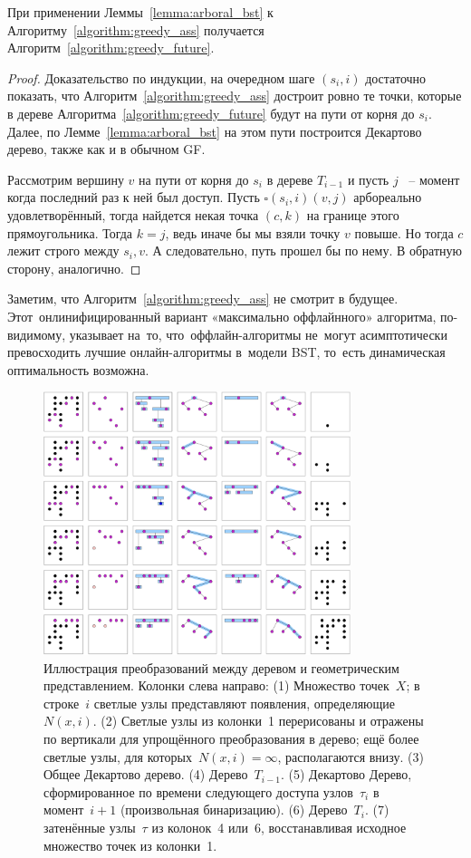 \documentclass[a4paper,11pt]{article}
\begin{document}
\begin{theorem}
	При применении Леммы~\ref{lemma:arboral_bst} к Алгоритму~\ref{algorithm:greedy_ass} получается Алгоритм~\ref{algorithm:greedy_future}.
\end{theorem}
\begin{proof}
	Доказательство по индукции, на очередном шаге $(s_i, i)$ достаточно показать, что Алгоритм~\ref{algorithm:greedy_ass} достроит ровно те точки, которые в дереве Алгоритма~\ref{algorithm:greedy_future} будут на пути от корня до $s_i$. 
	Далее, по Лемме~\ref{lemma:arboral_bst} на этом пути построится Декартово дерево, также как и в обычном GF.

	Рассмотрим вершину $v$ на пути от корня до $s_i$ в дереве $T_{i - 1}$ и пусть $j$ ~-- момент когда последний раз к ней был доступ.
	Пусть $\square (s_i, i) (v, j)$ арбореально удовлетворённый, тогда найдется некая точка $(c, k)$ на границе этого прямоугольника.
	Тогда $k = j$, ведь иначе бы мы взяли точку $v$ повыше.
	Но тогда $c$ лежит строго между $s_i, v$. 
	А следовательно, путь прошел бы по нему.
	В обратную сторону, аналогично.
\end{proof}

Заметим, что Алгоритм~\ref{algorithm:greedy_ass} не смотрит в будущее.
Этот~онлинифицированный вариант «максимально оффлайнного» алгоритма, по-видимому, указывает на~то, что~оффлайн-алгоритмы не~могут асимптотически превосходить лучшие онлайн-алгоритмы в~модели BST, то~есть динамическая оптимальность возможна.

\newpage
\begin{figure}[htpb]
	\centering
	\includegraphics[width=0.8\textwidth]{img/geometry.png}
	\caption{Иллюстрация преобразований между деревом и геометрическим представлением. Колонки слева направо:
(1) Множество точек~$X$; в строке~$i$ светлые узлы представляют появления, определяющие~$N(x, i)$. 
(2) Светлые узлы из колонки~1 перерисованы и отражены по вертикали для упрощённого преобразования в дерево; ещё более светлые узлы, для которых~$N(x, i) = \infty$, располагаются внизу.
(3) Общее Декартово дерево. 
(4) Дерево~$T_{i-1}$. 
(5) Декартово Дерево, сформированное по времени следующего доступа узлов~$\tau_i$ в момент~$i+1$ (произвольная бинаризацию).
(6) Дерево~$T_i$.
(7) затенённые узлы~$\tau$ из колонок~4 или~6, восстанавливая исходное множество точек из колонки~1.}
	\label{fig:geometry}
\end{figure}
\end{document}
